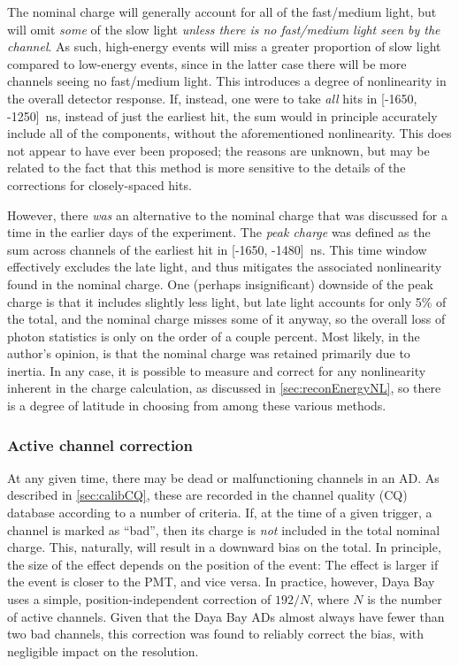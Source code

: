 \documentclass[../thesis.tex]{subfiles}
\begin{document}
The nominal charge will generally account for all of the fast/medium light, but will omit \emph{some} of the slow light \emph{unless there is no fast/medium light seen by the channel}. As such, high-energy events will miss a greater proportion of slow light compared to low-energy events, since in the latter case there will be more channels seeing no fast/medium light. This introduces a degree of nonlinearity in the overall detector response. If, instead, one were to take \emph{all} hits in [-1650, -1250]~ns, instead of just the earliest hit, the sum would in principle accurately include all of the components, without the aforementioned nonlinearity. This does not appear to have ever been proposed; the reasons are unknown, but may be related to the fact that this method is more sensitive to the details of the corrections for closely-spaced hits.

However, there \emph{was} an alternative to the nominal charge that was discussed for a time in the earlier days of the experiment. The \emph{peak charge} was defined as the sum across channels of the earliest hit in [-1650, -1480]~ns. This time window effectively excludes the late light, and thus mitigates the associated nonlinearity found in the nominal charge. One (perhaps insignificant) downside of the peak charge is that it includes slightly less light, but late light accounts for only 5\% of the total, and the nominal charge misses some of it anyway, so the overall loss of photon statistics is only on the order of a couple percent. Most likely, in the author's opinion, is that the nominal charge was retained primarily due to inertia. In any case, it is possible to measure and correct for any nonlinearity inherent in the charge calculation, as discussed in \autoref{sec:reconEnergyNL}, so there is a degree of latitude in choosing from among these various methods.

\subsubsection{Active channel correction}
\label{sec:reconActiveChan}

At any given time, there may be dead or malfunctioning channels in an AD. As described in \autoref{sec:calibCQ}, these are recorded in the channel quality (CQ) database according to a number of criteria. If, at the time of a given trigger, a channel is marked as ``bad'', then its charge is \emph{not} included in the total nominal charge. This, naturally, will result in a downward bias on the total. In principle, the size of the effect depends on the position of the event: The effect is larger if the event is closer to the PMT, and vice versa. In practice, however, Daya Bay uses a simple, position-independent correction of $192/N$, where $N$ is the number of active channels. Given that the Daya Bay ADs almost always have fewer than two bad channels, this correction was found to reliably correct the bias, with negligible impact on the resolution.
\end{document}
